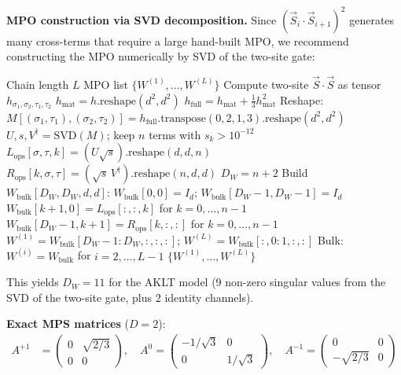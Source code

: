 \documentclass[aps,prb,onecolumn,scriptaddress]{revtex4-2}
\begin{document}
\textbf{MPO construction via SVD decomposition.} Since $(\vec{S}_i \cdot \vec{S}_{i+1})^2$ generates many cross-terms that require a large hand-built MPO, we recommend constructing the MPO numerically by SVD of the two-site gate:

\begin{algorithm}[H]
\caption{BuildAKLTMPO (SVD-based)}
\begin{algorithmic}[1]
\Require Chain length $L$
\Ensure MPO list $\{W^{(1)}, \ldots, W^{(L)}\}$
\State Compute two-site $\vec{S}\cdot\vec{S}$ as tensor $h_{\sigma_1,\sigma_2,\tau_1,\tau_2}$
\State $h_{\text{mat}} = h.\text{reshape}(d^2, d^2)$
\State $h_{\text{full}} = h_{\text{mat}} + \frac{1}{3} h_{\text{mat}}^2$ 
\State Reshape: $M[(\sigma_1,\tau_1), (\sigma_2,\tau_2)] = h_{\text{full}}.\text{transpose}(0,2,1,3).\text{reshape}(d^2, d^2)$
\State $U, s, V^\dagger = \text{SVD}(M)$; keep $n$ terms with $s_k > 10^{-12}$
\State $L_{\text{ops}}[{\sigma,\tau,k}] = (U \sqrt{s}).\text{reshape}(d, d, n)$
\State $R_{\text{ops}}[{k,\sigma,\tau}] = (\sqrt{s}\, V^\dagger).\text{reshape}(n, d, d)$
\State $D_W = n + 2$ 
\State Build $W_{\text{bulk}}[D_W, D_W, d, d]$:
\State \quad $W_{\text{bulk}}[0, 0] = I_d$; \quad $W_{\text{bulk}}[D_W{-}1, D_W{-}1] = I_d$
\State \quad $W_{\text{bulk}}[k{+}1, 0] = L_{\text{ops}}[:,:,k]$ for $k = 0,\ldots,n{-}1$
\State \quad $W_{\text{bulk}}[D_W{-}1, k{+}1] = R_{\text{ops}}[k,:,:]$ for $k = 0,\ldots,n{-}1$
\State $W^{(1)} = W_{\text{bulk}}[D_W{-}1:D_W, :, :, :]$; \quad $W^{(L)} = W_{\text{bulk}}[:, 0:1, :, :]$
\State Bulk: $W^{(i)} = W_{\text{bulk}}$ for $i = 2,\ldots,L{-}1$
\State \Return $\{W^{(1)}, \ldots, W^{(L)}\}$
\end{algorithmic}
\end{algorithm}

This yields $D_W = 11$ for the AKLT model (9 non-zero singular values from the SVD of the two-site gate, plus 2 identity channels).

\textbf{Exact MPS matrices} ($D = 2$):
\begin{align}
A^{+1} &= \begin{pmatrix} 0 & \sqrt{2/3} \\ 0 & 0 \end{pmatrix}, \quad
A^{0} = \begin{pmatrix} -1/\sqrt{3} & 0 \\ 0 & 1/\sqrt{3} \end{pmatrix}, \quad
A^{-1} = \begin{pmatrix} 0 & 0 \\ -\sqrt{2/3} & 0 \end{pmatrix}
\end{align}
\end{document}

